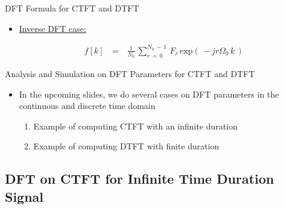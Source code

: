 \documentclass{beamer}
\begin{document}
\begin{frame}[t,allowframebreaks]{DFT Formula for CTFT and DTFT}
\begin{minipage}{\textwidth}
\begin{itemize}
where $\begin{cases}
r \, = \, 0,1,2, \rightarrow \, N_0 \, - \, 1 \\
\Omega_0 \, = \,  \displaystyle\frac{2 \, \pi}{N_0} \, = \, \text{freqeuncy step at which}\\
\text{we sample the DTFT spectrum}
\end{cases}$\\

\item  \underline{Inverse DFT case:}

\begin{equation}
\begin{array}{rcl}
f[k] \, &=&\, \displaystyle\frac{1}{N_0} \, \displaystyle\sum_{r \, = \, 0}^{N_0 \, - \, 1} \, F_r \, \text{exp} \left(\, -j r \Omega_0 \, k   \,\right)
\end{array}
\end{equation}

\end{itemize}

\end{minipage}


\end{frame}




\begin{frame}[t]{Analysis and Simulation on DFT Parameters for CTFT and DTFT}

\begin{itemize}

\item In the upcoming slides, we do several cases on DFT parameters in the continuous and discrete time domain

	\begin{enumerate}
	\item Example of computing CTFT with an infinite duration
	
	\item Example of computing DTFT with finite duration
	
	\end{enumerate}


\end{itemize}


\end{frame}

\subsection{DFT on CTFT for Infinite Time Duration Signal}
\end{document}
